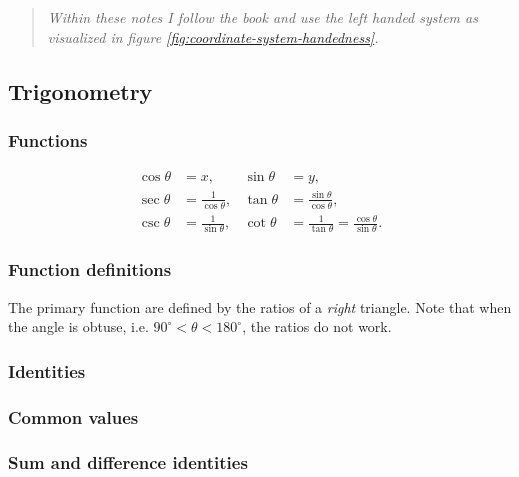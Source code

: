 \documentclass[11pt]{article}
\begin{document}
\begin{quote}
\emph{Within these notes I follow the book and use the left handed system as visualized in figure \ref{fig:coordinate-system-handedness}.}
\end{quote}

\subsection{Trigonometry}

\subsubsection{Functions}

\begin{align*}
\cos\theta &=x, &\sin\theta &=y, \\
\sec\theta &=\frac{1}{\cos\theta}, &\tan\theta &=\frac{\sin\theta}{\cos\theta}, \\
\csc\theta &=\frac{1}{\sin\theta}, &\cot\theta &=\frac{1}{\tan\theta}=\frac{\cos\theta}{\sin\theta}.
\end{align*}

\subsubsection{Function definitions}

The primary function are defined by the ratios of a \emph{right} triangle. Note that when the angle is obtuse, i.e. $90^\circ < \theta < 180^\circ$, the ratios do not work.


\subsubsection{Identities}

\subsubsection{Common values}


\subsubsection{Sum and difference identities}

\end{document}
